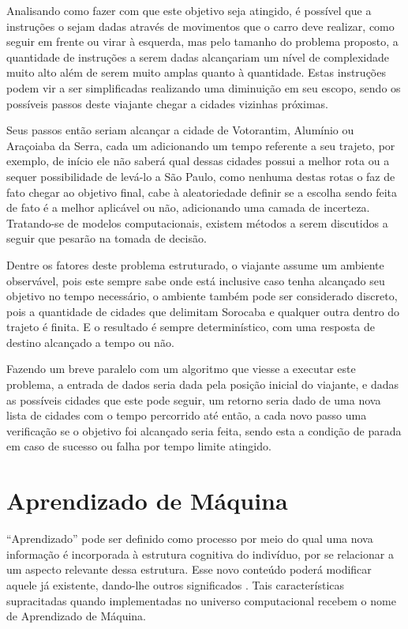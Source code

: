 Analisando como fazer com que este objetivo seja atingido, é possível
que a instruções o sejam dadas através de movimentos que o carro deve
realizar, como seguir em frente ou virar à esquerda, mas pelo tamanho
do problema proposto, a quantidade de instruções a serem dadas
alcançariam um nível de complexidade muito alto além de serem muito
amplas quanto à quantidade. Estas instruções podem vir a ser
simplificadas realizando uma diminuição em seu escopo, sendo os
possíveis passos deste viajante chegar a cidades vizinhas próximas.

Seus passos então seriam alcançar a cidade de Votorantim, Alumínio ou
Araçoiaba da Serra, cada um adicionando um tempo referente a seu
trajeto, por exemplo, de início ele não saberá qual dessas cidades
possui a melhor rota ou a sequer possibilidade de levá-lo a São Paulo,
como nenhuma destas rotas o faz de fato chegar ao objetivo final, cabe
à aleatoriedade definir se a escolha sendo feita de fato é a melhor
aplicável ou não, adicionando uma camada de incerteza. Tratando-se de
modelos computacionais, existem métodos a serem discutidos a seguir
que pesarão na tomada de decisão.

Dentre os fatores deste problema estruturado, o viajante assume um
ambiente observável, pois este sempre sabe onde está inclusive caso
tenha alcançado seu objetivo no tempo necessário, o ambiente também
pode ser considerado discreto, pois a quantidade de cidades que
delimitam Sorocaba e qualquer outra dentro do trajeto é finita. E o
resultado é sempre determinístico, com uma resposta de destino
alcançado a tempo ou não.

Fazendo um breve paralelo com um algoritmo que viesse a executar este
problema, a entrada de dados seria dada pela posição inicial do
viajante, e dadas as possíveis cidades que este pode seguir, um
retorno seria dado de uma nova lista de cidades com o tempo percorrido
até então, a cada novo passo uma verificação se o objetivo foi
alcançado seria feita, sendo esta a condição de parada em caso de
sucesso ou falha por tempo limite atingido.


\section{Aprendizado de M{\'a}quina}

``Aprendizado'' pode ser definido como processo por meio do qual uma
nova informação é incorporada à estrutura cognitiva do indivíduo, por
se relacionar a um aspecto relevante dessa estrutura. Esse novo
conteúdo poderá modificar aquele já existente, dando-lhe outros
significados \cite{michaelis2022}. Tais características supracitadas
quando implementadas no universo computacional recebem o nome de
Aprendizado de Máquina.

